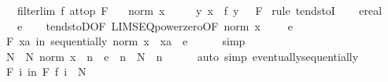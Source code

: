 \begin{isabellebody}
\ \ \ {\isachardoublequoteopen}filterlim\ f\ at{\isacharunderscore}{\kern0pt}top\ F{\isachardoublequoteclose}\isanewline
\ \ \ {\isachardoublequoteopen}norm\ x\ {\isacharless}{\kern0pt}\ {}{\isachardoublequoteclose}\isanewline
\ \ \ {\isachardoublequoteopen}{\isacharparenleft}{\kern0pt}{\isacharparenleft}{\kern0pt}{\isasymlambda}y{\isachardot}{\kern0pt}\ x\ {\isacharcircum}{\kern0pt}\ {\isacharparenleft}{\kern0pt}f\ y{\isacharparenright}{\kern0pt}{\isacharparenright}{\kern0pt}\ {\isasymlonglongrightarrow}\ {}{\isacharparenright}{\kern0pt}\ F{\isachardoublequoteclose}\isanewline
%
\isadelimproof
%
\endisadelimproof
%
\isatagproof
{}\isamarkupfalse%
\ {\isacharparenleft}{\kern0pt}rule\ tendstoI{\isacharparenright}{\kern0pt}\isanewline
\ \ \isamarkupfalse%
\ e{\isacharcolon}{\kern0pt}{\isacharcolon}{\kern0pt}real\ \isamarkupfalse%
\ {\isachardoublequoteopen}{}\ {\isacharless}{\kern0pt}\ e{\isachardoublequoteclose}\isanewline
\ \ \isamarkupfalse%
\ tendstoD{\isacharbrackleft}{\kern0pt}OF\ LIMSEQ{\isacharunderscore}{\kern0pt}power{\isacharunderscore}{\kern0pt}zero{\isacharbrackleft}{\kern0pt}OF\ {\isacartoucheopen}norm\ x\ {\isacharless}{\kern0pt}\ {}{\isacartoucheclose}{\isacharbrackright}{\kern0pt}\ {\isacartoucheopen}{}\ {\isacharless}{\kern0pt}\ e{\isacartoucheclose}{\isacharbrackright}{\kern0pt}\isanewline
\ \ \isamarkupfalse%
\ {\isachardoublequoteopen}{\isasymforall}\isactrlsub F\ xa\ in\ sequentially{\isachardot}{\kern0pt}\ norm\ {\isacharparenleft}{\kern0pt}x\ {\isacharcircum}{\kern0pt}\ xa{\isacharparenright}{\kern0pt}\ {\isacharless}{\kern0pt}\ e{\isachardoublequoteclose}\isanewline
\ \ \ \ \isamarkupfalse%
\ simp\isanewline
\ \ \isamarkupfalse%
\ \isamarkupfalse%
\ N\ \ N{\isacharcolon}{\kern0pt}\ {\isachardoublequoteopen}norm\ {\isacharparenleft}{\kern0pt}x\ {\isacharcircum}{\kern0pt}\ n{\isacharparenright}{\kern0pt}\ {\isacharless}{\kern0pt}\ e{\isachardoublequoteclose}\ \ {\isachardoublequoteopen}n\ {\isasymge}\ N{\isachardoublequoteclose}\ \ n\isanewline
\ \ \ \ \isamarkupfalse%
\ {\isacharparenleft}{\kern0pt}auto\ simp{\isacharcolon}{\kern0pt}\ eventually{\isacharunderscore}{\kern0pt}sequentially{\isacharparenright}{\kern0pt}\isanewline
\ \ \isamarkupfalse%
\ {\isachardoublequoteopen}{\isasymforall}\isactrlsub F\ i\ in\ F{\isachardot}{\kern0pt}\ f\ i\ {\isasymge}\ N{\isachardoublequoteclose}\isanewline

\end{isabellebody}
